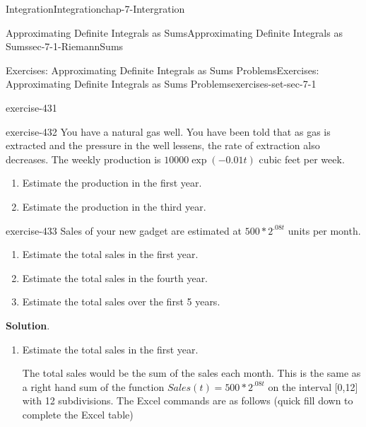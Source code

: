 \documentclass[oneside,10pt,]{book}
\numberwithin{equation}{section}
\begin{document}
\begin{chapterptx}{Integration}{}{Integration}{}{}{chap-7-Intergration}
\begin{sectionptx}{Approximating Definite Integrals as Sums}{}{Approximating Definite Integrals as Sums}{}{}{sec-7-1-RiemannSums}
\begin{exercises-subsection-numberless}{Exercises: Approximating Definite Integrals as Sums Problems}{}{Exercises: Approximating Definite Integrals as Sums Problems}{}{}{exercises-set-sec-7-1}
\begin{divisionexercise}{9}{}{}{exercise-431}
\begin{enumerate}[label=(\alph*)]
\end{enumerate}
\end{divisionexercise}%
\begin{divisionexercise}{10}{}{}{exercise-432}%
\hypertarget{p-2598}{}%
You have a natural gas well.  You have been told that as gas is extracted and the pressure in the well lessens, the rate of extraction also decreases. The weekly production is \(10000 \exp(-0.01 t)\) cubic feet per week.%
\leavevmode%
\begin{enumerate}[label=(\alph*)]
\item\hypertarget{li-699}{}\hypertarget{p-2599}{}%
Estimate the production in the first year.%
\item\hypertarget{li-700}{}\hypertarget{p-2600}{}%
Estimate the production in the third year.%
\end{enumerate}
\end{divisionexercise}%
\begin{divisionexercise}{11}{}{}{exercise-433}%
\hypertarget{p-2601}{}%
Sales of your new gadget are estimated at \(500*2^{.08 t}\) units per month.%
\leavevmode%
\begin{enumerate}[label=(\alph*)]
\item\hypertarget{li-701}{}\hypertarget{p-2602}{}%
Estimate the total sales in the first year.%
\item\hypertarget{li-702}{}\hypertarget{p-2603}{}%
Estimate the total sales in the fourth year.%
\item\hypertarget{li-703}{}\hypertarget{p-2604}{}%
Estimate the total sales over the first 5 years.%
\end{enumerate}
\par\smallskip%
\noindent\textbf{Solution}.\hypertarget{solution-219}{}\quad%
\leavevmode%
\begin{enumerate}[label=(\alph*)]
\item\hypertarget{li-704}{}\hypertarget{p-2605}{}%
Estimate the total sales in the first year.%
\par
\hypertarget{p-2606}{}%
The total sales would be the sum of the sales each month. This is the same as a right hand sum of the function \(Sales(t)= 500*2^{.08 t}\) on the interval [0,12] with 12 subdivisions. The Excel commands are as follows (quick fill down to complete the Excel table)%
\begin{sidebyside}{1}{0.1}{0.1}{0}%
\begin{sbspanel}{0.8}%

\end{sbspanel}
\end{sidebyside}
\end{enumerate}
\end{divisionexercise}
\end{exercises-subsection-numberless}
\end{sectionptx}
\end{chapterptx}
\end{document}
